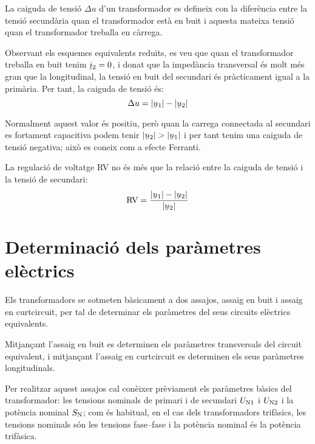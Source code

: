 La caiguda de tensió $\Delta u$ d'un transformador  es defineix con la diferència entre la tensió secundària quan el transformador està en buit i aquesta mateixa tensió quan el transformador treballa en càrrega.

Observant els esquemes equivalents reduïts, es veu que quan el transformador treballa en buit tenim $\cmplx{i}_2=0$, i donat que la impedància transversal és molt més gran que la longitudinal, la tensió en buit del secundari és pràcticament igual a la primària. Per tant, la caiguda de tensió és:
\begin{equation}
    \Delta u = |\cmplx{u}_1| - |\cmplx{u}_2|
\end{equation}

Normalment aquest valor és positiu, però quan la carrega connectada al secundari es fortament capacitiva podem tenir  $|\cmplx{u}_2| > |\cmplx{u}_1|$ i per tant tenim una caiguda de tensió negativa; això es coneix com a efecte Ferranti.

La regulació de voltatge RV no és més que la relació entre la caiguda de tensió i la tensió de secundari:
\begin{equation}
    \text{RV} = \frac{|\cmplx{u}_1| - |\cmplx{u}_2|}{|\cmplx{u}_2|}
\end{equation}

\section{Determinació dels paràmetres elèctrics}\label{sec:determ-param-trafo}

Els transformadors se sotmeten bàsicament a dos assajos, assaig en
buit i assaig en curtcircuit, per tal de determinar els paràmetres
del seus circuits elèctrics equivalents.

Mitjançant l'assaig en buit es determinen els paràmetres
transversals del circuit equivalent, i mitjançant l'assaig en curtcircuit es determinen els seus paràmetres longitudinals.

Per realitzar aquest assajos cal conèixer prèviament els paràmetres
bàsics del transformador: les tensions nominals de primari i de
secundari $U_\mathrm{N1}$ i $U_\mathrm{N2}$ i la potència nominal
$S_\mathrm{N}$; com és habitual, en el cas dels transformadors
trifàsics, les tensions nominals són les tensions fase--fase i la
potència nominal és la potència trifàsica.


